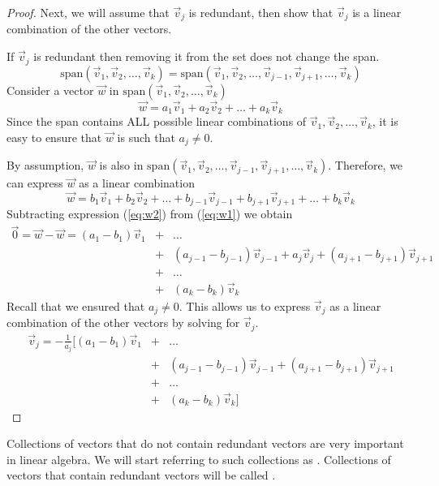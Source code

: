 \documentclass{ximera}
\begin{document}
\begin{proof}
Next, we will assume that $\vec{v}_j$ is redundant, then show that $\vec{v}_j$ is a linear combination of the other vectors.

If $\vec{v}_j$ is redundant then removing it from the set does not change the span. 
$$\mbox{span}\left(\vec{v}_1,\vec{v}_2,\dots,\vec{v}_k\right)=\mbox{span}\left(\vec{v}_1,\vec{v}_2,\dots,\vec{v}_{j-1},\vec{v}_{j+1},\dots,\vec{v}_k\right)$$
Consider a vector $\vec{w}$ in $\mbox{span}\left(\vec{v}_1,\vec{v}_2,\dots,\vec{v}_k\right)$  
\begin{equation}\label{eq:w1}
\vec{w}=a_1\vec{v}_1+a_2\vec{v}_2+\dots +a_k\vec{v}_k
\end{equation}
Since the span contains ALL possible linear combinations of $\vec{v}_1,\vec{v}_2,\dots,\vec{v}_k$, it is easy to ensure that $\vec{w}$ is such that $a_j\neq 0$.

By assumption, $\vec{w}$ is also in $\mbox{span}\left(\vec{v}_1,\vec{v}_2,\dots,\vec{v}_{j-1},\vec{v}_{j+1},\dots,\vec{v}_k\right)$.  Therefore, we can express $\vec{w}$ as a linear combination 
\begin{equation}\label{eq:w2}
\vec{w}=b_1\vec{v}_1+b_2\vec{v}_2+\dots +b_{j-1}\vec{v}_{j-1}+b_{j+1}\vec{v}_{j+1}+\dots +b_k\vec{v}_k
\end{equation}
Subtracting expression (\ref{eq:w2}) from (\ref{eq:w1}) we obtain
\begin{eqnarray}\label{eq:zero}
    \vec{0}=\vec{w}-\vec{w}=(a_1-b_1)\vec{v}_1&+&\dots\\ \nonumber
    &+&(a_{j-1}-b_{j-1})\vec{v}_{j-1}+a_j\vec{v}_j+(a_{j+1}-b_{j+1})\vec{v}_{j+1}\\ \nonumber
    &+&\dots\\ \nonumber
    &+&(a_k-b_k)\vec{v}_k
\end{eqnarray}
Recall that we ensured that $a_j\neq 0$.  This allows us to express $\vec{v}_j$ as a linear combination of the other vectors by solving for $\vec{v}_j$.
\begin{eqnarray*}
    \vec{v}_j=-\frac{1}{a_j}\Big[(a_1-b_1)\vec{v}_1&+&\dots\\
    &+&(a_{j-1}-b_{j-1})\vec{v}_{j-1}+(a_{j+1}-b_{j+1})\vec{v}_{j+1}\\
    &+&\dots\\
    &+&(a_k-b_k)\vec{v}_k\Big]
\end{eqnarray*}
 \end{proof}

 Collections of vectors that do not contain redundant vectors are very important in linear algebra.  We will start referring to such collections as .  Collections of vectors that contain redundant vectors will be called .   
\end{document}

